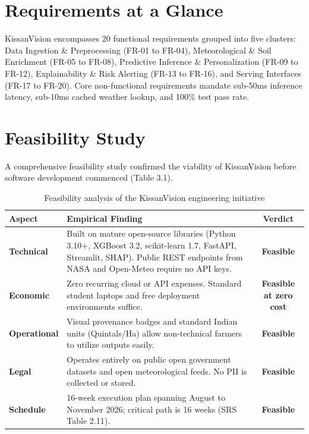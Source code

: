 \documentclass[11pt,a4paper]{report}
\begin{document}
\section{Requirements at a Glance}
KissanVision encompasses 20 functional requirements grouped into five clusters: Data Ingestion \& Preprocessing (FR-01 to FR-04), Meteorological \& Soil Enrichment (FR-05 to FR-08), Predictive Inference \& Personalization (FR-09 to FR-12), Explainability \& Risk Alerting (FR-13 to FR-16), and Serving Interfaces (FR-17 to FR-20). Core non-functional requirements mandate sub-50ms inference latency, sub-10ms cached weather lookup, and 100\% test pass rate.

\section{Feasibility Study}
A comprehensive feasibility study confirmed the viability of KissanVision before software development commenced (Table 3.1).

\begin{table}[htbp]
\centering
\small
\caption{Feasibility analysis of the KissanVision engineering initiative}
\begin{tabularx}{\textwidth}{lXc}
\toprule
\textbf{Aspect} & \textbf{Empirical Finding} & \textbf{Verdict} \\
\midrule
\textbf{Technical} & Built on mature open-source libraries (Python 3.10+, XGBoost 3.2, scikit-learn 1.7, FastAPI, Streamlit, SHAP). Public REST endpoints from NASA and Open-Meteo require no API keys. & \textbf{Feasible} \\
\addlinespace
\textbf{Economic} & Zero recurring cloud or API expenses. Standard student laptops and free deployment environments suffice. & \textbf{Feasible at zero cost} \\
\addlinespace
\textbf{Operational}& Visual provenance badges and standard Indian units (Quintals/Ha) allow non-technical farmers to utilize outputs easily. & \textbf{Feasible} \\
\addlinespace
\textbf{Legal} & Operates entirely on public open government datasets and open meteorological feeds. No PII is collected or stored. & \textbf{Feasible} \\
\addlinespace
\textbf{Schedule} & 16-week execution plan spanning August to November 2026; critical path is 16 weeks (SRS Table 2.11). & \textbf{Feasible} \\
\bottomrule
\end{tabularx}
\end{table}
\end{document}
